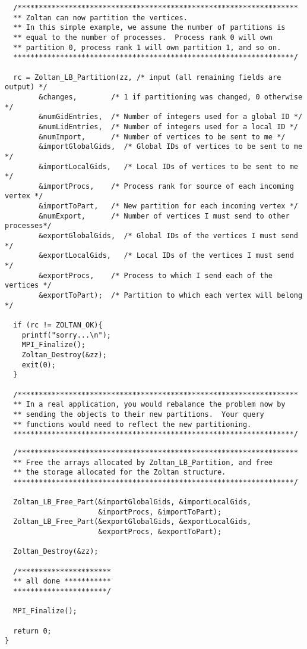 \clearpage
\begin{flushleft}
\begin{verbatim}
  /******************************************************************
  ** Zoltan can now partition the vertices.
  ** In this simple example, we assume the number of partitions is
  ** equal to the number of processes.  Process rank 0 will own
  ** partition 0, process rank 1 will own partition 1, and so on.
  ******************************************************************/

  rc = Zoltan_LB_Partition(zz, /* input (all remaining fields are output) */
        &changes,        /* 1 if partitioning was changed, 0 otherwise */ 
        &numGidEntries,  /* Number of integers used for a global ID */
        &numLidEntries,  /* Number of integers used for a local ID */
        &numImport,      /* Number of vertices to be sent to me */
        &importGlobalGids,  /* Global IDs of vertices to be sent to me */
        &importLocalGids,   /* Local IDs of vertices to be sent to me */
        &importProcs,    /* Process rank for source of each incoming vertex */
        &importToPart,   /* New partition for each incoming vertex */
        &numExport,      /* Number of vertices I must send to other processes*/
        &exportGlobalGids,  /* Global IDs of the vertices I must send */
        &exportLocalGids,   /* Local IDs of the vertices I must send */
        &exportProcs,    /* Process to which I send each of the vertices */
        &exportToPart);  /* Partition to which each vertex will belong */

  if (rc != ZOLTAN_OK){
    printf("sorry...\n");
    MPI_Finalize();
    Zoltan_Destroy(&zz);
    exit(0);
  }

  /******************************************************************
  ** In a real application, you would rebalance the problem now by
  ** sending the objects to their new partitions.  Your query 
  ** functions would need to reflect the new partitioning.
  ******************************************************************/
\end{verbatim}
\end{flushleft}

\clearpage
\begin{flushleft}
\begin{verbatim}
  /******************************************************************
  ** Free the arrays allocated by Zoltan_LB_Partition, and free
  ** the storage allocated for the Zoltan structure.
  ******************************************************************/

  Zoltan_LB_Free_Part(&importGlobalGids, &importLocalGids, 
                      &importProcs, &importToPart);
  Zoltan_LB_Free_Part(&exportGlobalGids, &exportLocalGids, 
                      &exportProcs, &exportToPart);

  Zoltan_Destroy(&zz);

  /**********************
  ** all done ***********
  **********************/

  MPI_Finalize();

  return 0;
}
\end{verbatim}
\end{flushleft}

